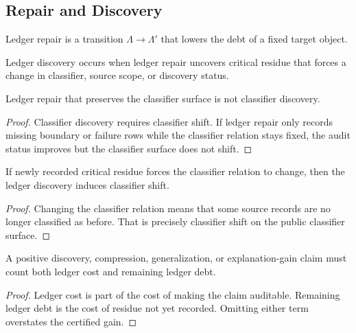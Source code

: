 \subsection{Repair and Discovery}
\label{subsec:philosophy-ledger-repair-discovery}

\begin{definition}
\label{def:philosophy-ledger-repair}
Ledger repair is a transition $\Lambda\to\Lambda'$ that lowers the debt
of a fixed target object.
\end{definition}

\begin{definition}
\label{def:philosophy-ledger-discovery}
Ledger discovery occurs when ledger repair uncovers critical residue that
forces a change in classifier, source scope, or discovery status.
\end{definition}

\begin{theorem}
\label{thm:philosophy-ledger-repair-not-discovery}
Ledger repair that preserves the classifier surface is not classifier
discovery.
\end{theorem}
\begin{proof}
Classifier discovery requires classifier shift. If ledger repair only
records missing boundary or failure rows while the classifier relation
stays fixed, the audit status improves but the classifier surface does
not shift.
\end{proof}

\begin{theorem}
\label{thm:philosophy-critical-ledger-discovery-can-induce-classifier-discovery}
If newly recorded critical residue forces the classifier relation to
change, then the ledger discovery induces classifier shift.
\end{theorem}
\begin{proof}
Changing the classifier relation means that some source records are no
longer classified as before. That is precisely classifier shift on the
public classifier surface.
\end{proof}

\begin{theorem}
\label{thm:philosophy-positive-claims-count-ledger-cost-debt}
A positive discovery, compression, generalization, or explanation-gain
claim must count both ledger cost and remaining ledger debt.
\end{theorem}
\begin{proof}
Ledger cost is part of the cost of making the claim auditable. Remaining
ledger debt is the cost of residue not yet recorded. Omitting either term
overstates the certified gain.
\end{proof}

